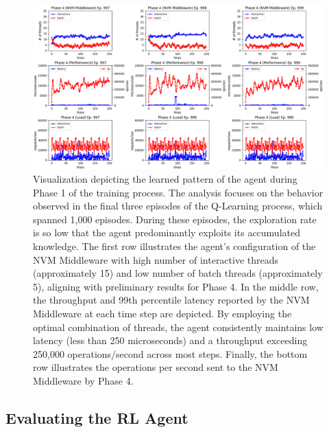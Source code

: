 \begin{figure}[H]
  \centering
  \includegraphics[width=\textwidth,height=\textheight,keepaspectratio,angle=0]{images/rl_training_phase4.png}
  \caption[Learned Pattern of Agent during Phase 3]{Visualization depicting the learned pattern of the agent during Phase 1 of the training process. The analysis focuses on the behavior observed in the final three episodes of the Q-Learning process, which spanned 1,000 episodes. During these episodes, the exploration rate is so low that the agent predominantly exploits its accumulated knowledge. The first row illustrates the agent's configuration of the NVM Middleware with high number of interactive threads (approximately 15) and low number of batch threads (approximately 5), aligning with preliminary results for Phase 4. In the middle row, the throughput and 99th percentile latency reported by the NVM Middleware at each time step are depicted. By employing the optimal combination of threads, the agent consistently maintains low latency (less than 250 microseconds) and a throughput exceeding 250,000 operations/second across most steps. Finally, the bottom row illustrates the operations per second sent to the NVM Middleware by Phase 4.}
  \label{fig:learned_phase_4}
\end{figure}

\subsection*{Evaluating the RL Agent}

